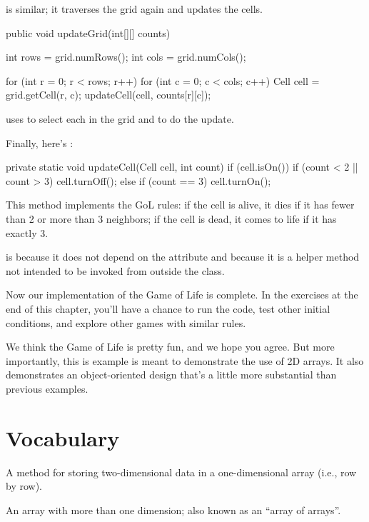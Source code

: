  is similar; it traverses the grid again and updates the cells.

\begin{code}
	public void updateGrid(int[][] counts) {
		int rows = grid.numRows();
        int cols = grid.numCols();

        for (int r = 0; r < rows; r++) {
            for (int c = 0; c < cols; c++) {
                Cell cell = grid.getCell(r, c);
                updateCell(cell, counts[r][c]);
            }
        }
	}
\end{code}

 uses  to select each  in the grid and  to do the update.

Finally, here's :

\begin{code}
private static void updateCell(Cell cell, int count) {
    if (cell.isOn()) {
        if (count < 2 || count > 3) {
            cell.turnOff();
        }
    } else {
        if (count == 3) {
            cell.turnOn();
        }
    }
}
\end{code}

This method implements the GoL rules: if the cell is alive, it dies if it has fewer than 2 or more than 3 neighbors; if the cell is dead, it comes to life if it has exactly 3.

 is  because it does not depend on the  attribute and  because it is a helper method not intended to be invoked from outside the class.

Now our implementation of the Game of Life is complete.
In the exercises at the end of this chapter, you'll have a chance to run the code, test other initial conditions, and explore other games with similar rules.

We think the Game of Life is pretty fun, and we hope you agree.
But more importantly, this is example is meant to demonstrate the use of 2D arrays.
It also demonstrates an object-oriented design that's a little more substantial than previous examples.  





\section{Vocabulary}

\begin{description}

A method for storing two-dimensional data in a one-dimensional array (i.e., row by row).

An array with more than one dimension; also known as an ``array of arrays''.


\end{description}


